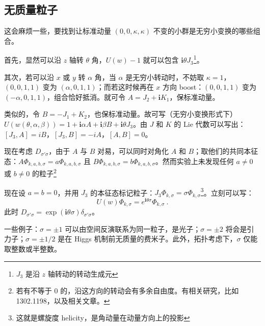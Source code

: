 \subsection{无质量粒子}
这会麻烦一些，要找到让标准动量 $(0, 0, \kappa, \kappa)$ 不变的小群是无穷小变换的哪些组合。

首先，显然可以沿 $z$ 轴转 $\theta$ 角，$U(w) - 1$ 就可以包含 $\mathbf{i} \theta J_3$\footnote{$J_3$ 是沿 $z$ 轴转动的转动生成元}。

其次，若可以沿 $x$ 或 $y$ 转 $\alpha$ 角，当 $\alpha$ 是无穷小转动时，不妨取 $\kappa = 1$，$(0, 0, 1, 1)$ 变为 $(\alpha, 0, 1, 1)$；而若这时候再在 $x$ 方向 boost：$(0, 0, 1, 1)$ 变为 $(-\alpha, 0, 1, 1)$，组合恰好抵消。就可令 $A = J_2 + \mathbf{i} K_1$，保标准动量。

类似的，令 $B = -J_1 + K_2$，也保标准动量。故可写（无穷小变换形式下） $U(w(\theta, \alpha, \beta)) = 1 + \mathbf{i} \alpha A + \mathbf{i} \beta B + \mathbf{i} \theta J_3$。由 $J$ 和 $K$ 的 Lie 代数可以写出：$[J_3, A] = iB$，$[J_3, B] = -iA$，$[A, B] = 0$。

现在考虑 $D_{\sigma' \sigma}$，由于 $A$ 与 $B$ 对易，可以同时对角化 $A$ 和 $B$；取他们的共同本征态：$A \Phi_{k, a, b, \sigma} = a \Phi_{k, a, b, \sigma}$ 且 $B \Phi_{k, a, b, \sigma} = b \Phi_{k, a, b, \sigma}$。然而实验上未发现任何 $a \neq 0$ 或 $b \neq 0$ 的粒子\footnote{若有不等于 $0$ 的，沿这方向的转动会有多余自由度。有相关研究，比如 1302.1198，以及相关文章。}

现在设 $a=b=0$，并用 $J_3$ 的本征态标记粒子：$J_3 \Phi_{k, \sigma} = \sigma \Phi_{k, \sigma}$\footnote{这就是螺旋度 helicity，是角动量在动量方向上的投影}。立刻可以写：
\begin{equation}
	U(w) \Phi_{k, \sigma} = e^{\mathbf{i} \theta \sigma} \Phi_{k, \sigma} ~.
\end{equation}
此时 $D_{\sigma' \sigma} = \exp(\mathbf{i} \theta \sigma) \delta_{\sigma' \sigma}$。

一些例子：$\sigma = \pm 1$ 可以由空间反演联系为同一粒子，是光子；$\sigma = \pm 2$ 将会是引力子；$\sigma = \pm 1/2$ 是在 Higgs 机制前无质量的费米子。此外，拓扑考虑下，$\sigma$ 仅能取整数或半整数。